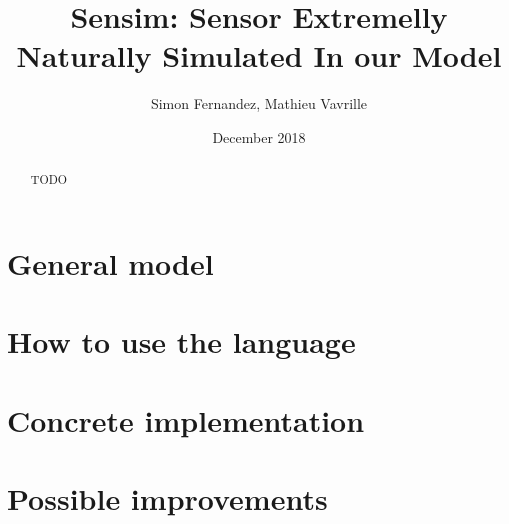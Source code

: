 \documentclass[a4paper,11pt]{article}
\title{Sensim: Sensor Extremelly Naturally Simulated In our Model}
\author{Simon Fernandez, Mathieu Vavrille}
\date{December 2018}
\begin{document}
\maketitle

\begin{abstract}
  TODO
\end{abstract}


\section{General model}





\section{How to use the language}







\section{Concrete implementation}






\section{Possible improvements}


\end{document}
